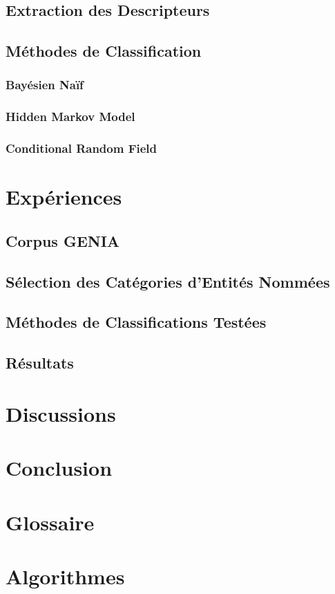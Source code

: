\documentclass[11pt,a4paper]{report}
\begin{document}
	\section{Extraction des Descripteurs}
		
	\section{Méthodes de Classification}
		\subsection{Bayésien Naïf}
			
  		\subsection{Hidden Markov Model}
  		\subsection{Conditional Random Field}
  
  
\chapter{Expériences}
  	\section{Corpus GENIA}
  		
  	\section{Sélection des Catégories d'Entités Nommées}
  	\section{Méthodes de Classifications Testées}
  	\section{Résultats}

\chapter{Discussions}


\chapter*{Conclusion}
	
	
\begin{appendices}
	\chapter{Glossaire}
		
	\chapter{Algorithmes}

	
	
\end{appendices}
\newpage
\newpage
\newpage
\end{document}
